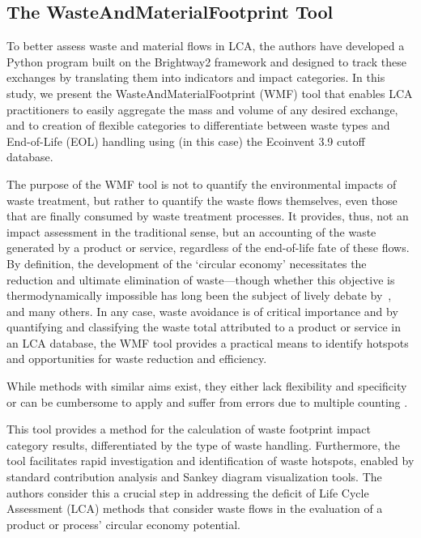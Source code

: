 \subsection{The WasteAndMaterialFootprint Tool}

To better assess waste and material flows in LCA, the authors have developed a Python program built on the Brightway2 framework and designed to track these exchanges by translating them into indicators and impact categories. In this study, we present the WasteAndMaterialFootprint (WMF) tool that enables LCA practitioners to easily aggregate the mass and volume of any desired exchange, and to creation of flexible categories to differentiate between waste types and End-of-Life (EOL) handling using (in this case) the Ecoinvent 3.9 cutoff database.

The purpose of the WMF tool is not to quantify the environmental impacts of waste treatment, but rather to quantify the waste flows themselves, even those that are finally consumed by waste treatment processes. It provides, thus, not an impact assessment in the traditional sense, but an accounting of the waste generated by a product or service, regardless of the end-of-life fate of these flows. By definition, the development of the `circular economy' necessitates the reduction and ultimate elimination of waste---though whether this objective is thermodynamically impossible has long been the subject of lively debate by~\cite{ayres1998recycling},~\cite{reuter2012recyclinglimits} and many others. In any case, waste avoidance is of critical importance and by quantifying and classifying the waste total attributed to a product or service in an LCA database, the WMF tool provides a practical means to identify hotspots and opportunities for waste reduction and efficiency.

While methods with similar aims exist, they either lack flexibility and specificity \citep{foen2021ecofactors} or can be cumbersome to apply and suffer from errors due to multiple counting \citep{laurenti2023wastefootprint}.

This tool provides a method for the calculation of waste footprint impact category results, differentiated by the type of waste handling. Furthermore, the tool facilitates rapid investigation and identification of waste hotspots, enabled by standard contribution analysis and Sankey diagram visualization tools. The authors consider this a crucial step in addressing the deficit of Life Cycle Assessment (LCA) methods that consider waste flows in the evaluation of a product or process' circular economy potential.






